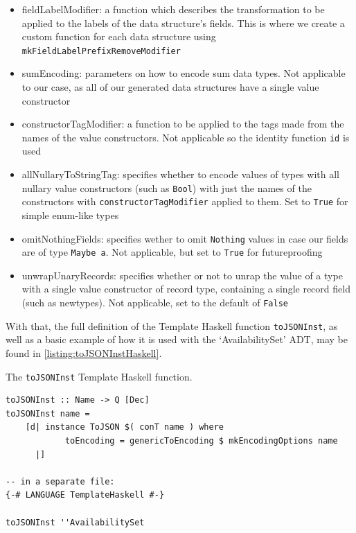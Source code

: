 \documentclass[11pt]{report}
\begin{document}
\begin{itemize}
    \item{} fieldLabelModifier: a function which describes the transformation
        to be applied to the labels of the data structure's fields. This is
        where we create a custom function for each data structure using
        \texttt{mkFieldLabelPrefixRemoveModifier}
    \item{} sumEncoding: parameters on how to encode sum data types. Not
        applicable to our case, as all of our generated data structures have a
        single value constructor
    \item{} constructorTagModifier: a function to be applied to the tags made
        from the names of the value constructors. Not applicable so the identity
        function \texttt{id} is used
    \item{} allNullaryToStringTag: specifies whether to encode values of types
        with all nullary value constructors (such as \texttt{Bool}) with just
        the names of the constructors with \texttt{constructorTagModifier}
        applied to them. Set to \texttt{True} for simple enum-like types
    \item{} omitNothingFields: specifies wether to omit \texttt{Nothing} values
        in case our fields are of type \texttt{Maybe a}. Not applicable, but
        set to \texttt{True} for futureproofing
    \item{} unwrapUnaryRecords: specifies whether or not to unrap the value of
        a type with a single value constructor of record type, containing a
        single record field (such as newtypes). Not applicable, set to the
        default of \texttt{False}
\end{itemize}

With that, the full definition of the Template Haskell function
\texttt{toJSONInst}, as well as a basic example of how it is used with the
`AvailabilitySet' ADT, may be found in \autoref{listing:toJSONInstHaskell}.

\begin{listing}[H]
\caption{The \texttt{toJSONInst} Template Haskell function.}
\label{listing:toJSONInstHaskell}
\begin{verbatim}
toJSONInst :: Name -> Q [Dec]
toJSONInst name =
    [d| instance ToJSON $( conT name ) where
            toEncoding = genericToEncoding $ mkEncodingOptions name
      |]

-- in a separate file:
{-# LANGUAGE TemplateHaskell #-}

toJSONInst ''AvailabilitySet
\end{verbatim}
\end{listing}
\end{document}
